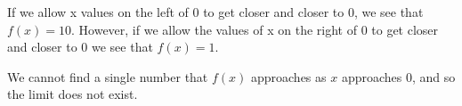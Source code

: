 \documentclass{ximera}
\begin{document}
\begin{example}
\begin{explanation}
If we allow x values on the left of 0 to get closer and closer to 0, we see
that $f(x) = 10$. However, if we allow the values of x  on the right of 0 to get closer and closer to 0 
 we see that $f(x)=1$.

We cannot find a single
number that $f(x)$ approaches as $x$ approaches 0, and so the
limit does not exist.
\end{explanation}
\end{example}

\begin{comment}
Tables can be used to help guess limits, but one must be careful.

\begin{question}
  Consider $f(x) = \sin\left(\frac{\pi}{x}\right)$. Fill in the tables
  below rounding to three decimal places:
  \[
  \begin{array}{l|l}
    x      & f(x)      \\ \hline
    0.1   &  \begin{prompt}\answer{0}\end{prompt}\\
    0.01   & \begin{prompt}\answer{0}\end{prompt}\\
    0.001  &  \begin{prompt}\answer{0}\end{prompt}\\
    0.0001 &  \begin{prompt}\answer{0}\end{prompt}\\ 
  \end{array}
    \]
  We may rush and say that, based on the table above,
   \[
  \lim_{x\to 0}\sin\left(\frac{\pi}{x}\right)=0.
  \]
  But, recall the definition of the limit: $L$ is the limit if the value of $f(x)$ is as close as one wishes to $L$ for
  \textbf{all} $x$ sufficiently close, but not equal to, $a$. 
  
  From this table we can see that $f(x)(=0)$ is as close as one wishes to $L(=0)$ for \textbf{some} values $x$ that are sufficiently close to $a(=0)$.
  But this does does not satisfy the definition of the limit, at least, not yet.
  

\end{comment}
\end{document}
